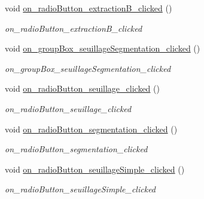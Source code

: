 \begin{DoxyCompactItemize}
void \hyperlink{classMainWindow_a1632f39c370309f84beef1262e176cc0}{on\+\_\+radio\+Button\+\_\+extraction\+B\+\_\+clicked} ()
\begin{DoxyCompactList}\small\item\em on\+\_\+radio\+Button\+\_\+extraction\+B\+\_\+clicked \end{DoxyCompactList}\item 
\mbox{\label{classMainWindow_a550c0d329f7ddaef00162e5960e75d3d}} 
void \hyperlink{classMainWindow_a550c0d329f7ddaef00162e5960e75d3d}{on\+\_\+group\+Box\+\_\+seuillage\+Segmentation\+\_\+clicked} ()
\begin{DoxyCompactList}\small\item\em on\+\_\+group\+Box\+\_\+seuillage\+Segmentation\+\_\+clicked \end{DoxyCompactList}\item 
\mbox{\label{classMainWindow_a2674db4d7c9dca3608d7bba7e5c19712}} 
void \hyperlink{classMainWindow_a2674db4d7c9dca3608d7bba7e5c19712}{on\+\_\+radio\+Button\+\_\+seuillage\+\_\+clicked} ()
\begin{DoxyCompactList}\small\item\em on\+\_\+radio\+Button\+\_\+seuillage\+\_\+clicked \end{DoxyCompactList}\item 
\mbox{\label{classMainWindow_abcf9df73bb70a451ebec8981b9de97a5}} 
void \hyperlink{classMainWindow_abcf9df73bb70a451ebec8981b9de97a5}{on\+\_\+radio\+Button\+\_\+segmentation\+\_\+clicked} ()
\begin{DoxyCompactList}\small\item\em on\+\_\+radio\+Button\+\_\+segmentation\+\_\+clicked \end{DoxyCompactList}\item 
\mbox{\label{classMainWindow_acd3de1b1aba25842b7cd46f6b16a7e14}} 
void \hyperlink{classMainWindow_acd3de1b1aba25842b7cd46f6b16a7e14}{on\+\_\+radio\+Button\+\_\+seuillage\+Simple\+\_\+clicked} ()
\begin{DoxyCompactList}\small\item\em on\+\_\+radio\+Button\+\_\+seuillage\+Simple\+\_\+clicked \end{DoxyCompactList}\item 
\mbox{\label{classMainWindow_a86a77b82762aa811b0a89cc8be7ce59e}} 

\end{DoxyCompactItemize}
